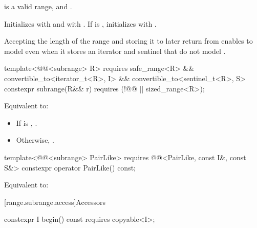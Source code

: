 \begin{itemdescr}
\pnum
\expects
{} is a valid range, and
.

\pnum
\effects
Initializes  with  and  with
. If  is , initializes  with
.

\pnum
\begin{note}
Accepting the length of the range and storing it to later return  from
 enables  to model  even
when it stores an iterator and sentinel that do not model
.
\end{note}
\end{itemdescr}

%
\begin{itemdecl}
template<@@<subrange> R>
  requires safe_range<R> &&
           convertible_to<iterator_t<R>, I> && convertible_to<sentinel_t<R>, S>
constexpr subrange(R&& r) requires (!@@ || sized_range<R>);
\end{itemdecl}

\begin{itemdescr}
\pnum
\effects
Equivalent to:
\begin{itemize}
\item If  is ,
.
\item Otherwise, .
\end{itemize}
\end{itemdescr}

%
\begin{itemdecl}
template<@@<subrange> PairLike>
  requires @@<PairLike, const I&, const S&>
constexpr operator PairLike() const;
\end{itemdecl}

\begin{itemdescr}
\pnum
\effects
Equivalent to: 
\end{itemdescr}

[range.subrange.access]{Accessors}

%
\begin{itemdecl}
constexpr I begin() const requires copyable<I>;
\end{itemdecl}

